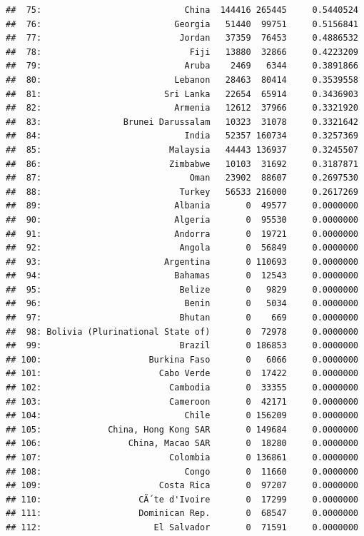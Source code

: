 \documentclass[10pt,]{article}
\begin{document}
\begin{verbatim}
##  75:                            China  144416 265445     0.5440524
##  76:                          Georgia   51440  99751     0.5156841
##  77:                           Jordan   37359  76453     0.4886532
##  78:                             Fiji   13880  32866     0.4223209
##  79:                            Aruba    2469   6344     0.3891866
##  80:                          Lebanon   28463  80414     0.3539558
##  81:                        Sri Lanka   22654  65914     0.3436903
##  82:                          Armenia   12612  37966     0.3321920
##  83:                Brunei Darussalam   10323  31078     0.3321642
##  84:                            India   52357 160734     0.3257369
##  85:                         Malaysia   44443 136937     0.3245507
##  86:                         Zimbabwe   10103  31692     0.3187871
##  87:                             Oman   23902  88607     0.2697530
##  88:                           Turkey   56533 216000     0.2617269
##  89:                          Albania       0  49577     0.0000000
##  90:                          Algeria       0  95530     0.0000000
##  91:                          Andorra       0  19721     0.0000000
##  92:                           Angola       0  56849     0.0000000
##  93:                        Argentina       0 110693     0.0000000
##  94:                          Bahamas       0  12543     0.0000000
##  95:                           Belize       0   9829     0.0000000
##  96:                            Benin       0   5034     0.0000000
##  97:                           Bhutan       0    669     0.0000000
##  98: Bolivia (Plurinational State of)       0  72978     0.0000000
##  99:                           Brazil       0 186853     0.0000000
## 100:                     Burkina Faso       0   6066     0.0000000
## 101:                       Cabo Verde       0  17422     0.0000000
## 102:                         Cambodia       0  33355     0.0000000
## 103:                         Cameroon       0  42171     0.0000000
## 104:                            Chile       0 156209     0.0000000
## 105:             China, Hong Kong SAR       0 149684     0.0000000
## 106:                 China, Macao SAR       0  18280     0.0000000
## 107:                         Colombia       0 136861     0.0000000
## 108:                            Congo       0  11660     0.0000000
## 109:                       Costa Rica       0  97207     0.0000000
## 110:                   CÃ´te d'Ivoire       0  17299     0.0000000
## 111:                   Dominican Rep.       0  68547     0.0000000
## 112:                      El Salvador       0  71591     0.0000000

\end{verbatim}
\end{document}
